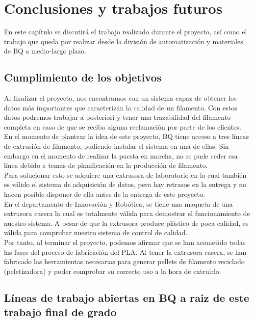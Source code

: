 \chapter{Conclusiones y trabajos futuros}
\label{cap:conclus}

En este capítulo se discutirá el trabajo realizado durante el proyecto, así como el trabajo que queda por realizar desde la división de automatización y materiales de BQ a medio-largo plazo.

\section{Cumplimiento de los objetivos}

Al finalizar el proyecto, nos encontramos con un sistema capaz de obtener los datos más importantes que caracterizan la calidad de un filamento. Con estos datos podremos trabajar a posteriori y tener una trazabilidad del filamento completa en caso de que se reciba alguna reclamación por parte de los clientes.\\

En el momento de plantear la idea de este proyecto, BQ tiene acceso a tres líneas de extrusión de filamento,  pudiendo instalar el sistema en una de ellas. Sin embargo en el momento de realizar la puesta en marcha, no se pude ceder esa línea debido a temas de planificación en la producción de filamento.\\

Para solucionar esto se adquiere una extrusora de laboratorio en la cual también es válido el sistema de adquisición de datos, pero hay retrasos en la entrega y no hacen posible disponer de ella antes de la entrega de este proyecto.\\

En el departamento de Innovación y Robótica, se tiene una maqueta de una extrusora casera la cual es totalmente válida para demostrar el funcionamiento de nuestro sistema. A pesar de que la extrusora produce plástico de poca calidad, es válida para comprobar nuestro sistema de control de calidad.\\

Por tanto, al terminar  el proyecto, podemos afirmar que se han acometido todas las fases del proceso de fabricación del PLA. Al tener la extrusora casera, se han fabricado las herramientas necesarias para generar pellets de filamento reciclado (peletizadora) y poder comprobar su correcto uso a la hora de extruirlo.

\section{Líneas de trabajo abiertas en BQ a raiz de este trabajo final de grado}

